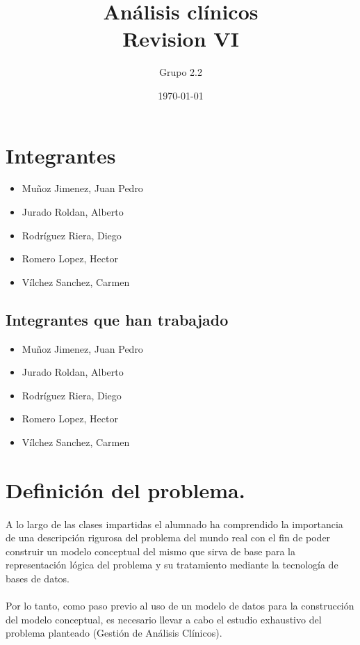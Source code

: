 \documentclass[a4paper,10pt]{article}
\title{Análisis clínicos\\{\small Revision VI}}
\author{Grupo 2.2}
\date{\today}
\begin{document}
\maketitle
\pagebreak
\tableofcontents

\pagebreak
\section{Integrantes}
\begin{itemize}
  \item Muñoz Jimenez, Juan Pedro
  \item Jurado Roldan, Alberto
	\item Rodríguez Riera, Diego
  \item Romero Lopez, Hector
  \item Vílchez Sanchez, Carmen
\end{itemize}

\subsection{Integrantes que han trabajado}
\begin{itemize}
  \item Muñoz Jimenez, Juan Pedro
  \item Jurado Roldan, Alberto
	\item Rodríguez Riera, Diego
  \item Romero Lopez, Hector
  \item Vílchez Sanchez, Carmen
\end{itemize}
\pagebreak

\section{Definición del problema.}
\paragraph{}
A lo largo de las clases impartidas el alumnado ha comprendido la importancia de una descripción rigurosa del problema del mundo real con el fin de poder construir un modelo conceptual del mismo que sirva de base para la representación lógica del problema y su tratamiento mediante la tecnología de bases de datos.
\paragraph{}
Por lo tanto, como paso previo al uso de un modelo de datos para la construcción del modelo conceptual, es necesario llevar a cabo el estudio exhaustivo del problema planteado (Gestión de Análisis Clínicos).
\end{document}
